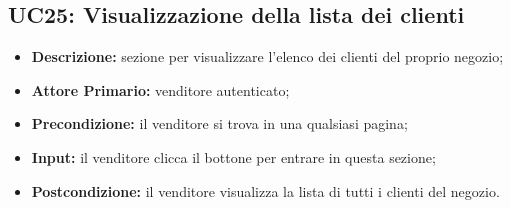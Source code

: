 \subsection{UC25: Visualizzazione della lista dei clienti}
\label{sec:UC25}
\begin{itemize}
    \item \textbf{Descrizione:} sezione per visualizzare l'elenco dei clienti del proprio negozio;
    \item \textbf{Attore Primario:} venditore autenticato;
    \item \textbf{Precondizione:} il venditore si trova in una qualsiasi pagina;
    \item \textbf{Input:} il venditore clicca il bottone per entrare in questa sezione;
    \item \textbf{Postcondizione:} il venditore visualizza la lista di tutti i clienti del negozio.
\end{itemize}